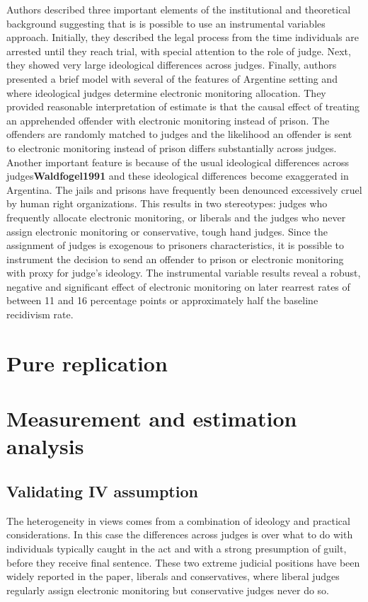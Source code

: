 \documentclass[a4paper,12pt]{article}
\begin{document}
Authors described three important elements of the institutional and theoretical background suggesting that is is possible to use an instrumental variables approach. Initially, they described the legal process from the time individuals are arrested until they reach trial, with special attention to the role of judge. Next, they showed very large ideological differences across judges. Finally, authors presented a brief model with several of the features of Argentine setting and where ideological judges determine electronic monitoring allocation.    
They provided reasonable interpretation of estimate is that the causal effect of treating an apprehended offender with electronic monitoring instead of prison. The offenders are randomly matched to judges and the likelihood an offender is sent to electronic monitoring instead of prison differs substantially across judges. Another important feature is because of the usual ideological differences across judges\textbf{Waldfogel1991}\cite{Waldfogel91} and these ideological differences become exaggerated in Argentina. The jails and prisons have frequently been denounced excessively cruel by human right organizations. This results in two stereotypes: judges who frequently allocate electronic monitoring, or liberals and the judges who never assign electronic monitoring or conservative, tough hand judges. Since the assignment of judges is exogenous to prisoners characteristics, it is possible to instrument the decision to send an offender to prison or electronic monitoring with proxy for judge's ideology. The instrumental variable results reveal a robust, negative and significant effect of electronic monitoring on later rearrest rates of between 11 and 16 percentage points or approximately half the baseline recidivism rate.   




\newpage
\section{Pure replication}

\newpage
\section{Measurement and estimation analysis}
\subsection{Validating IV assumption}
The heterogeneity in views comes from a combination of ideology and practical considerations. In this case the differences across judges is over what to do with individuals typically caught in the act and with a strong presumption of guilt, before they receive final sentence. These two extreme judicial positions have been widely reported in the paper, liberals and conservatives, where liberal judges regularly assign electronic monitoring but conservative judges never do so. 
\end{document}
